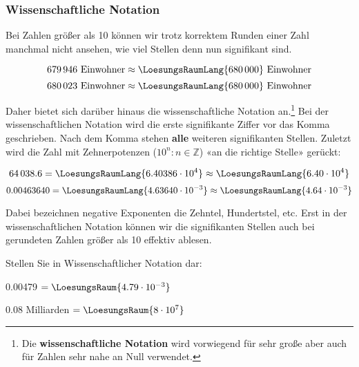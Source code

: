 
\newpage

  
\subsubsection{Wissenschaftliche Notation}\label{wissenschaftlicheNotation}
Bei Zahlen größer als 10 können wir trotz korrektem Runden einer Zahl manchmal nicht ansehen, wie viel Stellen denn nun signifikant sind.

$$ 679\,946 \text{\ Einwohner} \approx  \LoesungsRaumLang{680\,000} \text{\ Einwohner}$$
$$ 680\,023 \text{\ Einwohner} \approx  \LoesungsRaumLang{680\,000} \text{\ Einwohner}$$

Daher bietet sich darüber hinaus die wissenschaftliche Notation an.\footnote{Die
\textbf{wissenschaftliche Notation} wird vorwiegend für sehr große
aber auch für Zahlen sehr nahe an Null verwendet.}
Bei der wissenschaftlichen Notation wird die erste signifikante Ziffer
vor das Komma geschrieben. Nach dem Komma stehen \textbf{alle} weiteren signifikanten Stellen.
Zuletzt wird die Zahl mit Zehnerpotenzen
($10^{n}: n \in \mathbb{Z}$) «an die richtige Stelle» gerückt:

$$64\,038.6  = \LoesungsRaumLang{6.40386 \cdot 10^{ 4}} \approx \LoesungsRaumLang{6.40 \cdot 10^{ 4}}$$
$$0.00463640 = \LoesungsRaumLang{4.63640 \cdot 10^{-3}} \approx \LoesungsRaumLang{4.64 \cdot 10^{-3}}$$

Dabei bezeichnen negative Exponenten die Zehntel, Hundertstel, etc.
Erst in der wissenschaftlichen Notation können wir die signifikanten Stellen auch bei gerundeten Zahlen größer als 10 effektiv ablesen.


Stellen Sie in Wissenschaftlicher Notation dar:

0.00479 $= \LoesungsRaum{4.79 \cdot{}10^{-3}}$

0.08 Milliarden $= \LoesungsRaum{8\cdot{}10^7}$



\newpage


